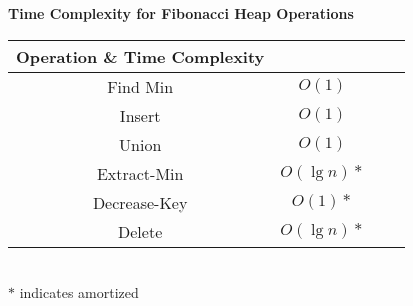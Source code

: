 \begin{center}
	\textbf{Time Complexity for Fibonacci Heap Operations}
 \begin{tabular}{c c c c||} 
 \hline
 Operation \& Time Complexity \\ [0.5ex] 
 \hline\hline
 Find Min & $O(1)$ \\ 
 \hline
 Insert & $O(1)$ \\
 \hline
 Union & $O(1)$ \\
 \hline
 Extract-Min & $O(\lg{n})*$ \\
 \hline
 Decrease-Key & $O(1)*$ \\
 \hline
 Delete & $O(\lg{n})*$ \\ [1ex] 
 \hline
\end{tabular}\\
$*$ indicates amortized
\end{center}









